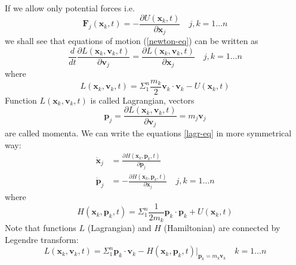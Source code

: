 If we allow only potential forces i.e. 
\begin{equation}
  \label {pot-force}
        \bm F_j(\bm x_k,t)=-\frac{\partial U(\bm x_k,t)}{\partial \bm x_j} \quad j,k=1\ldots n 
\end{equation}
we shall see that equations of motion (\ref{newton-eq}) can be written as 
\begin{equation}
   \label {lagr-eq}
    \frac{d}{dt} \frac{\partial L({\bm x}_k,{\bm v}_k,t)}{\partial {\bm v}_j}= 
    \frac{\partial L({\bm x}_k,{\bm v}_k,t)}{\partial {\bm x}_j}\quad j,k=1\ldots n 
\end{equation} 
where 
\begin{equation}
  \label{lagr-nat}
        L({\bm x}_k,{\bm v}_k,t)=\Sigma_1^n \frac{m_k}{2} {\bm v}_k \cdot {\bm v}_k-U({\bm x}_k,t) 
\end{equation}
Function $L({\bm x}_k,{\bm v}_k,t)$ is called Lagrangian, vectors 
\[{\bm p}_j= \frac{\partial L({\bm x}_k,{\bm v}_k,t)}{\partial {\bm v}_j}
=m_j \bm v_j \] 
are called momenta. 
We can write the equations \eqref{lagr-eq} in more symmetrical way:
\begin{equation}
   \label {ham-eq}
   \begin{split}
       \dot {\bm x}_j&=\frac{\partial H(\bm x_k,\bm p_k,t)}{\partial \bm p_j}  \\ 
        \dot {\bm p}_j&= -\frac{\partial H(\bm x_k,\bm p_k,t)}{\partial \bm x_j}\quad j,k=1\ldots n    
   \end{split}
\end{equation}
where 
\begin{equation}
        H(\bm x_k,\bm p_k,t)=\Sigma_1^n \frac{1}{2 m_k} \bm p_k \cdot \bm p_k+U(\bm x_k,t) \label{ham-nat}
\end{equation}
Note that functions $L$ (Lagrangian) and $H$ (Hamiltonian) are connected by Legendre transform:
\begin{equation}
        L(\bm x_k,\bm v_k,t)=\Sigma_1^n  \bm p_k \cdot \bm v_k -H(\bm x_k,\bm p_k,t)|_{\bm p_k=m_k\bm v_k}
\quad k=1\ldots n \label {lagr-ham}
\end{equation}


